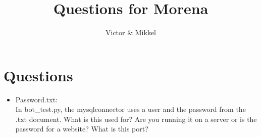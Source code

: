 \documentclass{article}
\begin{document}
\title{Questions for Morena}
\author{Victor \& Mikkel}

\maketitle

\section{Questions}
\begin{itemize}
	\item Password.txt: \\
    In bot\_test.py, the mysqlconnector uses a user and the password from the .txt document. 
    What is this used for? 
    Are you running it on a server or is the password for a website?
    What is this port?

\end{itemize}
\end{document}
